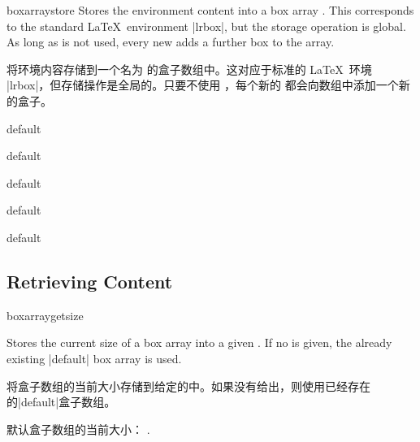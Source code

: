 \begin{docEnvironment}[doc new=2015-07-13]{boxarraystore}{}
Stores the environment content into a box array .
This corresponds to the standard \LaTeX\ environment |lrbox|, but
the storage operation is global. As long as  is
not used, every new  adds a further box to
the array.

将环境内容存储到一个名为  的盒子数组中。这对应于标准的 \LaTeX\ 环境 |lrbox|，但存储操作是全局的。只要不使用 ，每个新的  都会向数组中添加一个新的盒子。
\begin{dispExample}
\boxarrayreset
\begin{boxarraystore}{default}\end{boxarraystore}
\begin{boxarraystore}{default}\end{boxarraystore}
\begin{boxarraystore}{default}\end{boxarraystore}
\begin{boxarraystore}{default}\end{boxarraystore}
\begin{boxarraystore}{default}\end{boxarraystore}
\hfill
{}
\end{dispExample}
\end{docEnvironment}

\subsection{Retrieving Content}\label{subsec:magazine_retrieve}

\begin{docCommand}[doc new=2015-07-13]{boxarraygetsize}{}
\begin{articleside}[before skip=5pt]
Stores the current size of a box array  into a given .
If no  is given, the already existing |default| box array is used.

将盒子数组的当前大小存储到给定的中。如果没有给出，则使用已经存在的|default|盒子数组。
\begin{dispExample}
\boxarraygetsize{\mysize}
默认盒子数组的当前大小：
\mysize.
\end{dispExample}
\tcblower{}
\end{articleside}
\end{docCommand}


